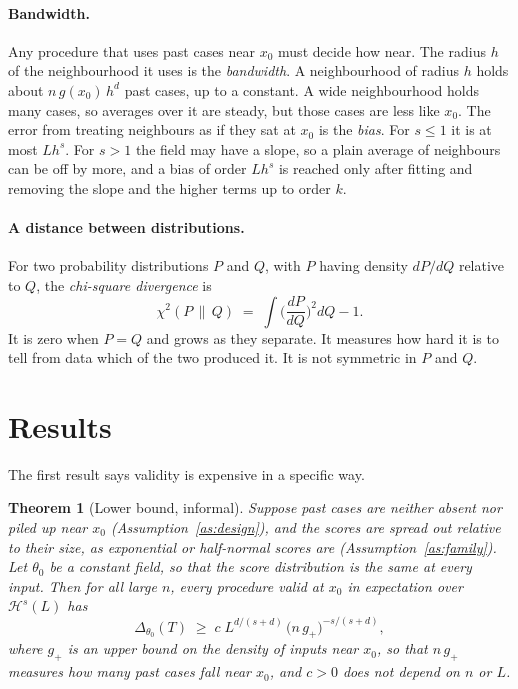 \documentclass[11pt]{article}
\newtheorem{theorem}{Theorem}
\theoremstyle{definition}
\theoremstyle{remark}
\newcommand{\chis}{\chi^2}
\begin{document}
\paragraph{Bandwidth.}
Any procedure that uses past cases near $x_0$ must decide how near. The radius $h$ of the
neighbourhood it uses is the \emph{bandwidth}. A neighbourhood of radius $h$ holds about
$n\,g(x_0)\,h^d$ past cases, up to a constant. A wide neighbourhood holds many cases, so
averages over it are steady, but those cases are less like $x_0$. The error from treating
neighbours as if they sat at $x_0$ is the \emph{bias}. For $s\le1$ it is at most $Lh^s$.
For $s>1$ the field may have a slope, so a plain average of neighbours can be off by more,
and a bias of order $Lh^s$ is reached only after fitting and removing the slope and the
higher terms up to order $k$.

\paragraph{A distance between distributions.}
For two probability distributions $P$ and $Q$, with $P$ having density $dP/dQ$ relative to
$Q$, the \emph{chi-square divergence} is
\[
  \chis(P\,\|\,Q)\;=\;\int\Big(\frac{dP}{dQ}\Big)^{2}dQ-1 .
\]
It is zero when $P=Q$ and grows as they separate. It measures how hard it is to tell from
data which of the two produced it. It is not symmetric in $P$ and $Q$.

\section{Results}\label{sec:results}

The first result says validity is expensive in a specific way.

\begin{theorem}[Lower bound, informal]
Suppose past cases are neither absent nor piled up near $x_0$
(Assumption~\ref{as:design}), and the scores are spread out relative to their size, as
exponential or half-normal scores are (Assumption~\ref{as:family}). Let $\theta_0$ be a
constant field, so that the score distribution is the same at every input. Then for all large $n$, every procedure valid
at $x_0$ in expectation over $\mathcal H^s(L)$ has
\[
  \Delta_{\theta_0}(T)\;\ge\;
  c\;L^{d/(s+d)}\,\big(n\,g_+\big)^{-s/(s+d)},
\]
where $g_+$ is an upper bound on the density of inputs near $x_0$, so that $n\,g_+$ measures
how many past cases fall near $x_0$, and $c>0$ does not depend on $n$ or $L$.
\end{theorem}
\end{document}
